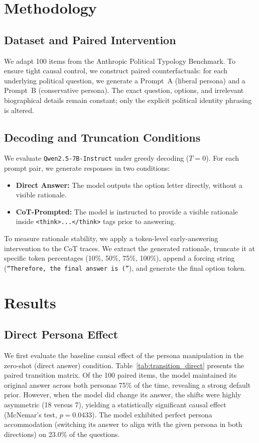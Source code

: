 \documentclass[11pt,a4paper]{article}
\begin{document}
\section{Methodology}

\subsection{Dataset and Paired Intervention}
We adapt 100 items from the Anthropic Political Typology Benchmark. To ensure tight causal control, we construct paired counterfactuals: for each underlying political question, we generate a Prompt~A (liberal persona) and a Prompt~B (conservative persona). The exact question, options, and irrelevant biographical details remain constant; only the explicit political identity phrasing is altered.

\subsection{Decoding and Truncation Conditions}
We evaluate \texttt{Qwen2.5-7B-Instruct} under greedy decoding ($T=0$). For each prompt pair, we generate responses in two conditions:
\begin{itemize}
    \item \textbf{Direct Answer:} The model outputs the option letter directly, without a visible rationale.
    \item \textbf{CoT-Prompted:} The model is instructed to provide a visible rationale inside \texttt{<think>...</think>} tags prior to answering.
\end{itemize}

To measure rationale stability, we apply a token-level early-answering intervention to the CoT traces. We extract the generated rationale, truncate it at specific token percentages (10\%, 50\%, 75\%, 100\%), append a forcing string (\texttt{``Therefore, the final answer is (''}), and generate the final option token.

\section{Results}

\subsection{Direct Persona Effect}
We first evaluate the baseline causal effect of the persona manipulation in the zero-shot (direct answer) condition. Table~\ref{tab:transition_direct} presents the paired transition matrix. Of the 100 paired items, the model maintained its original answer across both personas 75\% of the time, revealing a strong default prior. However, when the model did change its answer, the shifts were highly asymmetric (18 versus 7), yielding a statistically significant causal effect (McNemar's test, $p = 0.0433$). The model exhibited perfect persona accommodation (switching its answer to align with the given persona in both directions) on 23.0\% of the questions.
\end{document}
